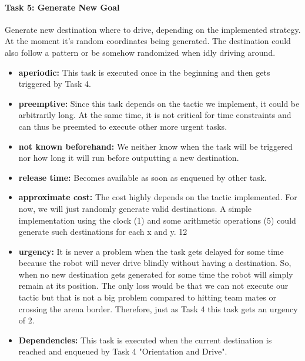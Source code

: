 \documentclass[12pt]{article}
\begin{document}
\paragraph{Task 5: Generate New Goal}
Generate new destination where to drive, depending on the implemented strategy. At the moment it's random coordinates being generated. The destination could also follow a pattern or be somehow randomized when idly driving around.
  \begin{itemize}
	\item \textbf{aperiodic:} This task is executed once in the beginning and then gets triggered by Task 4.
	\item \textbf{preemptive:} Since this task depends on the tactic we implement, it could be arbitrarily long. At the same time, it is not critical for time constraints and can thus be preemted to execute other more urgent tasks.
  	\item \textbf{not known beforehand:} We neither know when the task will be triggered nor how long it will run before outputting a new destination.
  	\item \textbf{release time:} Becomes available as soon as enqueued by other task.
  	\item \textbf{approximate cost:} The cost highly depends on the tactic implemented. For now, we will just randomly generate valid destinations. A simple implementation using the clock (1) and some arithmetic operations (5) could generate such destinations for each x and y. 12
  	\item \textbf{urgency:} It is never a problem when the task gets delayed for some time because the robot will never drive blindly without having a destination. So, when no new destination gets generated for some time the robot will simply remain at its position. The only loss would be that we can not execute our tactic but that is not a big problem compared to hitting team mates or crossing the arena border. Therefore, just as Task 4 this task gets an urgency of 2.
  	\item \textbf{Dependencies:} This task is executed when the current destination is reached and enqueued by Task 4 "Orientation and Drive".
   	\end{itemize}
\end{document}
